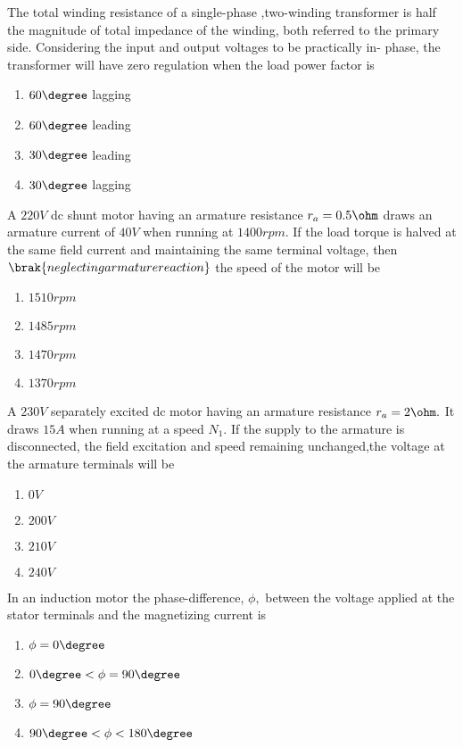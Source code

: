     \item The total winding resistance of a single-phase ,two-winding transformer is half the magnitude of total impedance of the winding, both referred to the primary side. Considering the input and output voltages to be practically in- phase, the transformer will have zero regulation when the load power factor is 
    \begin{enumerate}
        \item $60 \degree$ lagging
        \item $60 \degree$ leading
        \item $30 \degree$ leading
        \item $30 \degree$ lagging\\  
    \end{enumerate}


    \item A $220V$ dc shunt motor having an armature resistance $r_{a} = 0.5 \ohm$  draws an armature current of $40 V$ when running at $1400 rpm.$ If the load torque is halved at the same field current and maintaining the same terminal voltage, then $\brak{neglecting armature reaction}$ the speed of the motor will be 
    \begin{enumerate}
        \item $1510 rpm$
        \item $1485 rpm$
        \item $1470 rpm$
        \item $1370 rpm$ \\
    \end{enumerate}


    
    \item A $230 V$ separately excited dc  motor having an armature resistance $r_{a} = 2 \ohm.$ It draws $15 A$ when running at a speed $N_{1}.$ If the supply to the armature is disconnected, the field excitation and speed remaining unchanged,the voltage at the armature terminals will be 
    \begin{enumerate}
        \item $0 V$
        \item $200 V$
        \item $210 V$
        \item $240 V$ \\
    \end{enumerate}


    \item In an induction motor the phase-difference, $\phi,$ between the voltage applied at the stator terminals and the magnetizing current is
    \begin{enumerate}
       \item $\phi = 0\degree$
       \item $0\degree < \phi = 90\degree$
       \item $\phi = 90\degree$
       \item $90 \degree < \phi < 180 \degree$ \\
    \end{enumerate}

    

 
